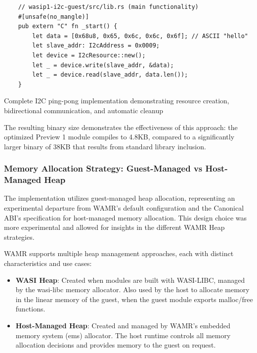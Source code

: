 \begin{listing}[H]
    \begin{verbatim}
    // wasip1-i2c-guest/src/lib.rs (main functionality)
    #[unsafe(no_mangle)]
    pub extern "C" fn _start() {
        let data = [0x68u8, 0x65, 0x6c, 0x6c, 0x6f]; // ASCII "hello"
        let slave_addr: I2cAddress = 0x0009;
        let device = I2cResource::new();
        let _ = device.write(slave_addr, &data);
        let _ = device.read(slave_addr, data.len());
    }
    \end{verbatim}
    \caption{Complete I2C ping-pong implementation demonstrating resource creation, bidirectional communication, and automatic cleanup}
    \label{lst:preview1-main-functionality}
\end{listing}

The resulting binary size demonstrates the effectiveness of this approach: the optimized Preview 1 module compiles to 4.8KB, compared to a significantly larger binary of 38KB that results from standard library inclusion.

\subsubsection{Memory Allocation Strategy: Guest-Managed vs Host-Managed Heap}

The implementation utilizes guest-managed heap allocation, representing an experimental departure from WAMR's default configuration and the Canonical ABI's specification for host-managed memory allocation. This design choice was more experimental and allowed for insights in the different WAMR Heap strategies. 

WAMR supports multiple heap management approaches, each with distinct characteristics and use cases:

\begin{itemize}
    \item \textbf{WASI Heap}: Created when modules are built with WASI-LIBC, managed by the wasi-libc memory allocator. Also used by the host to allocate memory in the linear memory of the guest, when the guest module exports malloc/free functions.
    \item \textbf{Host-Managed Heap}: Created and managed by WAMR's embedded memory system (ems) allocator. The host runtime controls all memory allocation decisions and provides memory to the guest on request.
\end{itemize}

